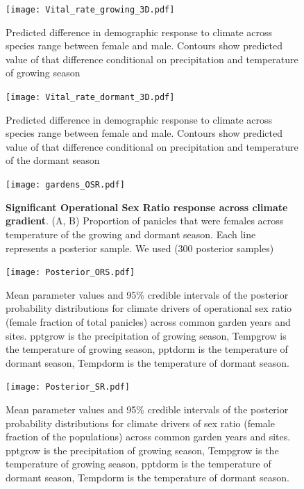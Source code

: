 \documentclass[9pt,twoside,lineno]{pnas-new}
\begin{document}
\begin{figure}
\centering
\texttt{[image: Vital\_rate\_growing\_3D.pdf]}
\caption{ Predicted difference in demographic response to climate across species range between female and male. Contours show predicted value of that difference conditional on precipitation and temperature of  growing season }
\label{Sup:vt_3D_grow}
\end{figure}
\clearpage

\begin{figure}
\centering
\texttt{[image: Vital\_rate\_dormant\_3D.pdf]}
\caption{ Predicted difference in demographic response to climate across species range between female and male. Contours show predicted value of that difference conditional on precipitation and temperature of the dormant  season }
\label{Sup:vt_3D_dorm}
\end{figure}
\clearpage

\begin{figure}
\centering
\texttt{[image: gardens\_OSR.pdf]}
\caption{\textbf{Significant Operational Sex Ratio response across climate gradient}.
			(A, B) Proportion of panicles that were females across  temperature of the growing and dormant season.
			Each line represents a  posterior sample. We used (300 posterior samples)  }
\label{Sup:gardens_OSR}
\end{figure}
\clearpage

\begin{figure}
\centering
\texttt{[image: Posterior\_ORS.pdf]}
\caption{Mean parameter values and 95\% credible intervals of the posterior probability distributions for climate drivers of operational sex ratio (female fraction of total panicles) across common garden years and sites. 
		pptgrow is  the precipitation of growing season,
		Tempgrow is the temperature of growing season,
		pptdorm is the temperature of dormant season,
		Tempdorm is the temperature of dormant season.}
\label{Sup:posterior_OSR}
\end{figure}
\clearpage

\begin{figure}
\centering
\texttt{[image: Posterior\_SR.pdf]}
\caption{Mean parameter values and 95\% credible intervals of the posterior probability distributions for climate drivers of sex ratio (female fraction of the populations) across common garden years and sites. 
			pptgrow is  the precipitation of growing season,
			Tempgrow is the temperature of growing season,
			pptdorm is the temperature of dormant season,
			Tempdorm is the temperature of dormant season.}
\label{Sup:posterior_SR}
\end{figure}
\clearpage
\end{document}
